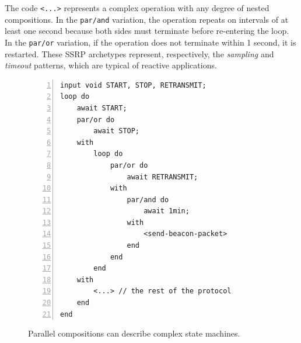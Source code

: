 \documentclass{sigplanconf}
\newcommand{\code}[1] {{\small{\texttt{#1}}}}
\newcommand{\1}{\;}
\newcommand{\2}{\;\;}
\newcommand{\3}{\;\;\;}
\newcommand{\5}{\;\;\;\;\;}
\begin{document}
The code \code{<...>} represents a complex operation with any degree of nested 
compositions.
%
In the \code{par/and} variation, the operation repeats on intervals of at least 
one second because both sides must terminate before re-entering the loop.
In the \code{par/or} variation, if the operation does not terminate within 1 
second, it is restarted.
%
These SSRP archetypes represent, respectively, the \emph{sampling} and 
\emph{timeout} patterns, which are typical of reactive applications.


\begin{figure}%
\begin{lstlisting}[numbers=left,xleftmargin=3em]
input void START, STOP, RETRANSMIT;
loop do
    await START;
    par/or do
        await STOP;
    with
        loop do
            par/or do
                await RETRANSMIT;
            with
                par/and do
                    await 1min;
                with
                    <send-beacon-packet>
                end
            end
        end
    with
        <...> // the rest of the protocol
    end
end
\end{lstlisting}
\caption{ Parallel compositions can describe complex state machines.
\label{lst.ctp}
}
\end{figure}
\end{document}
